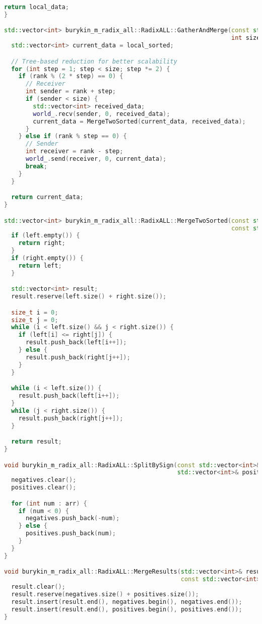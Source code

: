 \documentclass[12pt]{article}
\begin{document}
\begin{lstlisting}[language=C++]
  return local_data;
}

std::vector<int> burykin_m_radix_all::RadixALL::GatherAndMerge(const std::vector<int>& local_sorted, int rank,
                                                               int size) {
  std::vector<int> current_data = local_sorted;

  // Tree-based reduction for better scalability
  for (int step = 1; step < size; step *= 2) {
    if (rank % (2 * step) == 0) {
      // Receiver
      int sender = rank + step;
      if (sender < size) {
        std::vector<int> received_data;
        world_.recv(sender, 0, received_data);
        current_data = MergeTwoSorted(current_data, received_data);
      }
    } else if (rank % step == 0) {
      // Sender
      int receiver = rank - step;
      world_.send(receiver, 0, current_data);
      break;
    }
  }

  return current_data;
}

std::vector<int> burykin_m_radix_all::RadixALL::MergeTwoSorted(const std::vector<int>& left,
                                                               const std::vector<int>& right) {
  if (left.empty()) {
    return right;
  }
  if (right.empty()) {
    return left;
  }

  std::vector<int> result;
  result.reserve(left.size() + right.size());

  size_t i = 0;
  size_t j = 0;
  while (i < left.size() && j < right.size()) {
    if (left[i] <= right[j]) {
      result.push_back(left[i++]);
    } else {
      result.push_back(right[j++]);
    }
  }

  while (i < left.size()) {
    result.push_back(left[i++]);
  }
  while (j < right.size()) {
    result.push_back(right[j++]);
  }

  return result;
}

void burykin_m_radix_all::RadixALL::SplitBySign(const std::vector<int>& arr, std::vector<int>& negatives,
                                                std::vector<int>& positives) {
  negatives.clear();
  positives.clear();

  for (int num : arr) {
    if (num < 0) {
      negatives.push_back(-num);
    } else {
      positives.push_back(num);
    }
  }
}

void burykin_m_radix_all::RadixALL::MergeResults(std::vector<int>& result, const std::vector<int>& negatives,
                                                 const std::vector<int>& positives) {
  result.clear();
  result.reserve(negatives.size() + positives.size());
  result.insert(result.end(), negatives.begin(), negatives.end());
  result.insert(result.end(), positives.begin(), positives.end());
}
\end{lstlisting}
\end{document}
